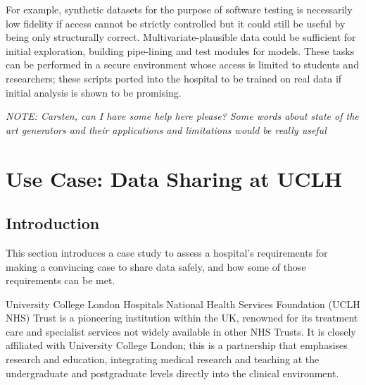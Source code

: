 \documentclass[11pt]{article}
\begin{document}
For example, synthetic datasets for the purpose of software testing is necessarily low fidelity if access cannot be strictly controlled but it could still be useful by being only structurally correct.  Multivariate-plausible data could be sufficient for initial exploration, building pipe-lining and test modules for models. These tasks can be performed in a secure environment whose access is limited to students and researchers; these scripts ported into the hospital to be trained on real data if initial analysis is shown to be promising.


\textit{NOTE: Carsten, can I have some help here please? Some words about state of the art generators and their applications and limitations would be really useful}

\section{Use Case: Data Sharing at UCLH}

\subsection{Introduction}

This section introduces a case study to assess a hospital's requirements for making a convincing case to share data safely, and how some of those requirements can be met. 

University College London Hospitals National Health Services Foundation (UCLH NHS) Trust  is a pioneering institution within the UK, renowned for its treatment care and specialist services not widely available in other NHS Trusts. It is closely affiliated with University College London; this is a partnership that emphasises research and education, integrating medical research and teaching at the undergraduate and postgraduate levels directly into the clinical environment. 
\end{document}
